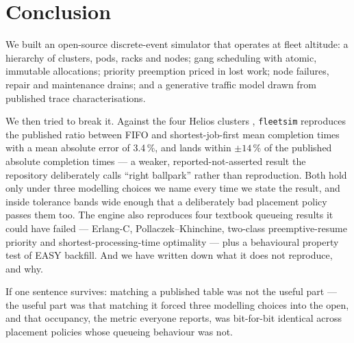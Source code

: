 \section{Conclusion}
\label{sec:conclusion}

We built an open-source discrete-event simulator that operates at fleet altitude:
a hierarchy of clusters, pods, racks and nodes; gang scheduling with atomic,
immutable allocations; priority preemption priced in lost work; node failures,
repair and maintenance drains; and a generative traffic model drawn from
published trace characterisations.

We then tried to break it. Against the four Helios clusters \cite{helios2021},
\texttt{fleetsim} reproduces the published ratio between FIFO and
shortest-job-first mean completion times with a mean absolute error of 3.4\,\%,
and lands within $\pm 14$\,\% of the published absolute completion times --- a
weaker, reported-not-asserted result the repository deliberately calls ``right
ballpark'' rather than reproduction. Both hold only under three modelling
choices we name every time we state the result, and inside tolerance bands wide
enough that a deliberately bad placement policy passes them too. The engine also
reproduces four textbook queueing results it could have failed --- Erlang-C,
Pollaczek--Khinchine, two-class preemptive-resume priority and
shortest-processing-time optimality --- plus a behavioural property test of EASY
backfill. And we have written down what it does not reproduce, and why.

If one sentence survives: matching a published table was not the useful part ---
the useful part was that matching it forced three modelling choices into the
open, and that occupancy, the metric everyone reports, was bit-for-bit identical
across placement policies whose queueing behaviour was not.
